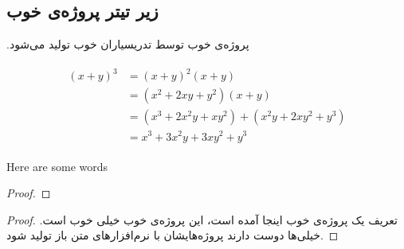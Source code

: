 \documentclass[10pt,twoside]{article}
\begin{document}
\subsection{زیر تیتر پروژه‌ی خوب}
\par
.پروژه‌ی خوب توسط تدریسیاران خوب تولید می‌شود

\begin{align}
\begin{split}
(x+y)^3 &= (x+y)^2(x+y)\\
&=(x^2+2xy+y^2)(x+y)\\
&=(x^3+2x^2y+xy^2) + (x^2y+2xy^2+y^3)\\
&=x^3+3x^2y+3xy^2+y^3
\end{split}					
\end{align}

Here are some words 

\begin{latin}
	\begin{proof}
		\lipsum[1]
	\end{proof}
\end{latin}

\begin{proof}
	تعریف یک پروژه‌ی خوب اینجا آمده است، این پروژه‌ی خوب خیلی خوب است.
	خیلی‌ها دوست دارند پروژه‌هایشان با نرم‌افزارهای متن باز تولید شود.
\end{proof}
\end{document}
